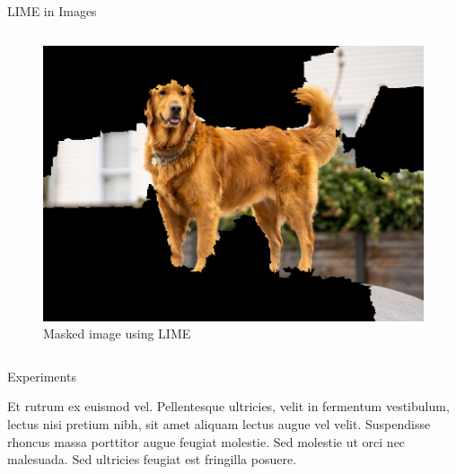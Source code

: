 \documentclass[final]{beamer}
\newlength{\colwidth}
\begin{document}
\begin{frame}[t]
\begin{columns}[t]
\begin{column}{\colwidth}
\begin{block}{LIME in Images}
\begin{columns}
      \begin{column}{0.5\textwidth}
        \begin{figure}
          \centering
          \includegraphics[width=0.85\linewidth]{images/lime.png}
          \caption{Masked image using LIME}
        \end{figure}
      \end{column}

    \end{columns}

    
  \end{block}

  \begin{block}{Experiments}

    Et rutrum ex euismod vel. Pellentesque ultricies, velit in fermentum
    vestibulum, lectus nisi pretium nibh, sit amet aliquam lectus augue vel
    velit. Suspendisse rhoncus massa porttitor augue feugiat molestie. Sed
    molestie ut orci nec malesuada. Sed ultricies feugiat est fringilla
    posuere.

\vspace{1em}


\end{block}
\end{column}
\end{columns}
\end{frame}
\end{document}
